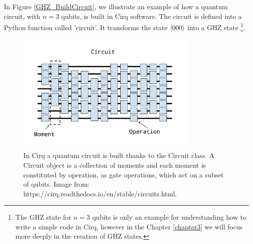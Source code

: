  In Figure \ref{GHZ_BuildCircuit}, we illustrate an example of how a quantum circuit, with $n=3$ qubits, is built in Cirq software. The circuit is defined into a Python function called 'circuit'. It transforms the state $\left| 000 \right \rangle$ into a GHZ state \footnote{The GHZ state for $n=3$ qubits is only an example for understanding how to write a simple code in Cirq, however in the Chapter \ref{chapter3} we will focus more deeply in the creation of GHZ states.}.




\begin{figure}[h!]
\centering
\includegraphics[width=0.8\textwidth]{./chapter2/image/CircuitMomentOperation.png} 
\caption{\label{CircuitMomentOperation} In Cirq a quantum circuit is built thanks to the {\selectfont Circuit} class. A {\selectfont Circuit} object is a collection of moments and each moment is constituted by operation, as gate operations, which act on a subset of qubits. Image from: https://cirq.readthedocs.io/en/stable/circuits.html.}
\end{figure}

